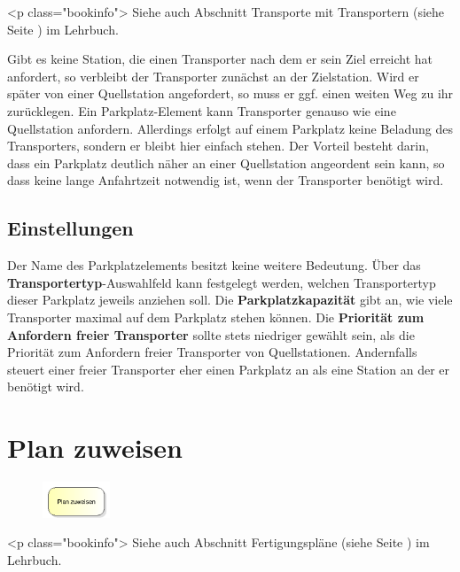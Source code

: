 <p class="bookinfo">
Siehe auch Abschnitt Transporte mit Transportern (siehe Seite \pageref{ref:book:8.3.2}) im Lehrbuch.

Gibt es keine Station, die einen Transporter nach dem er sein Ziel erreicht hat
anfordert, so verbleibt der Transporter zunächst an der Zielstation. Wird er später
von einer Quellstation angefordert, so muss er ggf. einen weiten Weg zu ihr zurücklegen.
Ein Parkplatz-Element kann Transporter genauso wie eine Quellstation anfordern.
Allerdings erfolgt auf einem Parkplatz keine Beladung des Transporters, sondern er
bleibt hier einfach stehen. Der Vorteil besteht darin, dass ein Parkplatz deutlich
näher an einer Quellstation angeordent sein kann, so dass keine lange Anfahrtzeit
notwendig ist, wenn der Transporter benötigt wird.

\subsection*{Einstellungen}

Der Name des Parkplatzelements besitzt keine weitere Bedeutung.
Über das \textbf{Transportertyp}-Auswahlfeld kann festgelegt werden, welchen
Transportertyp dieser Parkplatz jeweils anziehen soll. Die \textbf{Parkplatzkapazität}
gibt an, wie viele Transporter maximal auf dem Parkplatz stehen können.
Die \textbf{Priorität zum Anfordern freier Transporter} sollte stets niedriger
gewählt sein, als die Priorität zum Anfordern freier Transporter von Quellstationen.
Andernfalls steuert einer freier Transporter eher einen Parkplatz an als eine
Station an der er benötigt wird.


\section{Plan zuweisen}
\label{ref:ModelElementAssignSequence}

\begin{figure}
\vspace{-22pt}
\includegraphics[width=2cm]{imageModelElementAssignSequence.png}
\vspace{-22pt}
\end{figure}

<p class="bookinfo">
Siehe auch Abschnitt Fertigungspläne (siehe Seite \pageref{ref:book:8.3.3}) im Lehrbuch.


